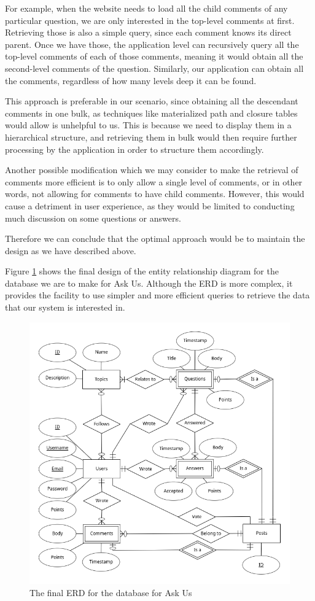 For example, when the website needs to load all the child comments of any particular question, we are only interested in the top-level comments at first. Retrieving those is also a simple query, since each comment knows its direct parent. Once we have those, the application level can recursively query all the top-level comments of each of those comments, meaning it would obtain all the second-level comments of the question. Similarly, our application can obtain all the comments, regardless of how many levels deep it can be found.

This approach is preferable in our scenario, since obtaining all the descendant comments in one bulk, as techniques like materialized path and closure tables would allow is unhelpful to us. This is because we need to display them in a hierarchical structure, and retrieving them in bulk would then require further processing by the application in order to structure them accordingly.

Another possible modification which we may consider to make the retrieval of comments more efficient is to only allow a single level of comments, or in other words, not allowing for comments to have child comments. However, this would cause a detriment in user experience, as they would be limited to conducting much discussion on some questions or answers.

Therefore we can conclude that the optimal approach would be to maintain the design as we have described above.

Figure \ref{erd2} shows the final design of the entity relationship diagram for the database we are to make for Ask Us. Although the ERD is more complex, it provides the facility to use simpler and more efficient queries to retrieve the data that our system is interested in.

\begin{figure}[p]
	\centering
	\includegraphics[width=\linewidth]{../ERD/erd.png}
	\caption{The final ERD for the database for Ask Us}
	\label{erd2}
\end{figure}